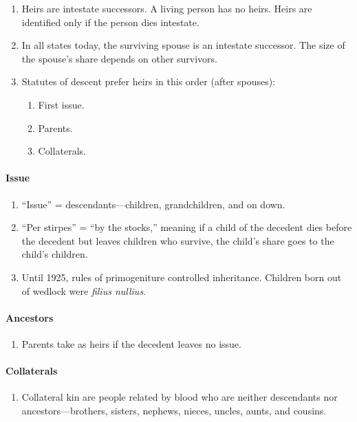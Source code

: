 \begin{enumerate}
    \item Heirs are intestate successors. A living person has no heirs.
    Heirs are identified only if the person dies intestate.
    \item In all states today, the surviving spouse is an intestate successor. 
    The size of the spouse's share depends on other survivors.
    \item Statutes of descent prefer heirs in this order (after spouses):
    \begin{enumerate}
        \item First issue.
        \item Parents.
        \item Collaterals.
    \end{enumerate}
\end{enumerate}

\paragraph{Issue}

\begin{enumerate}
    \item ``Issue'' = descendants---children, grandchildren, and on down.
    \item ``Per stirpes'' = ``by the stocks,'' meaning if a child of the 
    decedent dies before the decedent but leaves children who survive, the 
    child's share goes to the child's children.
    \item Until 1925, rules of primogeniture controlled inheritance. Children 
    born out of wedlock were \emph{filius nullius}.
\end{enumerate}

\paragraph{Ancestors}

\begin{enumerate}
    \item Parents take as heirs if the decedent leaves no issue.
\end{enumerate}

\paragraph{Collaterals}

\begin{enumerate}
    \item Collateral kin are people related by blood who are neither 
    descendants nor ancestors---brothers, sisters, nephews, nieces, uncles, 
    aunts, and cousins.
\end{enumerate}

